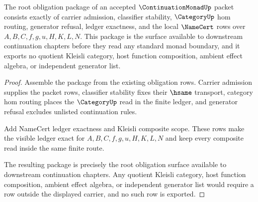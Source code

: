 \begin{theorem}
\label{thm:continuation-monad-root-unblock-package}
The root obligation package of an accepted $\ContinuationMonadUp$ packet consists exactly of carrier admission, classifier stability, $\CategoryUp$ hom routing, generator refusal, ledger exactness, and the local $\NameCert$ rows over $A,B,C,f,g,u,H,K,L,N$. This package is the surface available to downstream continuation chapters before they read any standard monad boundary, and it exports no quotient Kleisli category, host function composition, ambient effect algebra, or independent generator list.
\end{theorem}
\begin{proof}
Assemble the package from the existing obligation rows. Carrier admission supplies the packet rows, classifier stability fixes their $\hsame$ transport, category hom routing places the $\CategoryUp$ read in the finite ledger, and generator refusal excludes unlisted continuation rules.

Add NameCert ledger exactness and Kleisli composite scope. These rows make the visible ledger exact for $A,B,C,f,g,u,H,K,L,N$ and keep every composite read inside the same finite route.

The resulting package is precisely the root obligation surface available to downstream continuation chapters. Any quotient Kleisli category, host function composition, ambient effect algebra, or independent generator list would require a row outside the displayed carrier, and no such row is exported.
\end{proof}

